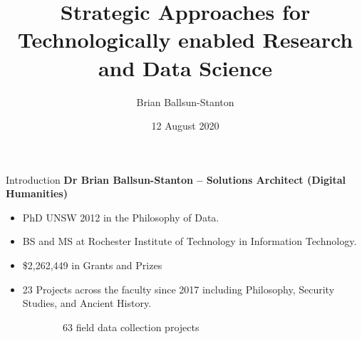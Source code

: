 \documentclass[aspectratio=169, 11pt]{beamer} %
\title{Strategic Approaches for Technologically enabled Research and Data Science} %
\author{Brian Ballsun-Stanton}               %
\institute{Faculty of Arts}         %
\date{12 August 2020}                 %
\begin{document}
\maketitle

\begin{frame}{Introduction}
\textbf{Dr Brian Ballsun-Stanton -- Solutions Architect (Digital Humanities)}
\begin{multicols}{2}
\begin{itemize}
    \item PhD UNSW 2012 in the Philosophy of Data. 
    \item BS and MS at Rochester Institute of Technology in Information Technology.
    \item \$2,262,449 in Grants and Prizes
    \item 23 Projects across the faculty since 2017 including Philosophy, Security Studies, and Ancient History.
\end{itemize}
\end{multicols}

\begin{figure}
\vspace{-0.8cm}
    \begin{subfigure}{.19\textwidth}
    \centering

    \caption{63 field data collection projects}
    \end{subfigure}%
    \hfill%
    \begin{subfigure}{.19\textwidth}


\end{subfigure}
\end{figure}
\end{frame}
\end{document}
